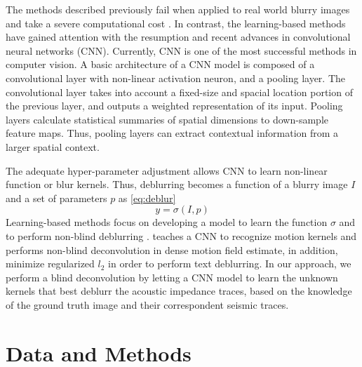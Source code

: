 \documentclass[journal]{IEEEtran}
\begin{document}
The methods described previously fail when applied to real world
blurry images \cite{Lai2016} and take a severe computational cost
\cite{Chakrabarti2016}. In contrast, the learning-based methods
have gained attention with the resumption and recent advances in
convolutional neural networks (CNN). 
Currently, CNN is one of the most successful methods in computer vision.
A basic architecture of a CNN model is composed of a convolutional layer
with non-linear activation neuron, and a pooling layer.
The convolutional layer takes into account a fixed-size and spacial
location portion of the previous layer, and outputs
a weighted representation of its input.
Pooling layers calculate statistical summaries of spatial dimensions
to down-sample feature maps. Thus, pooling layers can extract
contextual information from a larger spatial context.

The adequate hyper-parameter adjustment allows CNN to learn non-linear
function or blur kernels. Thus, deblurring becomes a function of
a blurry image $I$ and a set of parameters $p$ as \ref{eq:deblur}
\begin{equation}
 y = \sigma(I,p)
 \label{eq:deblur}
\end{equation}
Learning-based methods focus on developing a model to learn the function
$\sigma$ and to perform non-blind deblurring \cite{Chakrabarti2016}.
\cite{Sun2015} teaches a CNN to recognize motion kernels and performs non-blind
deconvolution in dense motion field estimate, in addition, \cite{Hradis2015}
minimize regularized $l_2$ in order to perform text deblurring.
In our approach, we perform a blind deconvolution by letting a CNN model
to learn the unknown kernels that best deblurr the acoustic impedance
traces, based on the knowledge of the ground truth image and their
correspondent seismic traces.

\section{Data and Methods}\label{Method}
\end{document}
